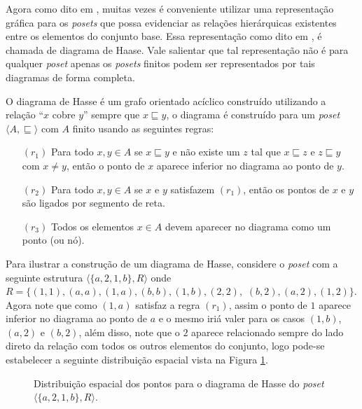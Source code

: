 Agora como dito em \cite{morgado1962poset}, muitas vezes é conveniente utilizar uma representação gráfica para os \textit{posets} que possa evidenciar as relações hierárquicas existentes entre os elementos do conjunto base. Essa representação como dito em \cite{abe1991-TC}, é chamada de diagrama de Haase. Vale salientar que tal representação não é para qualquer \textit{poset} apenas os \textit{posets} finitos podem ser representados por tais diagramas de forma completa.

O diagrama de Hasse é um grafo orientado acíclico construído utilizando a relação ``$x$ cobre $y$'' sempre que $x \sqsubseteq y$, o diagrama é construído para um \textit{poset} $\langle A, \sqsubseteq \rangle$ com $A$ finito usando as seguintes regras:

\begin{itemize}
	\item[$(r_1)$] Para todo $x, y \in A$ se $x \sqsubseteq  y$ e não existe um $z$ tal que $x \sqsubseteq  z$ e $z \sqsubseteq  y$ com $x \neq y$, então o ponto de $x$ aparece inferior no diagrama ao ponto de $y$.
	\item[$(r_2)$] Para todo $x, y \in A$ se $x$ e $y$ satisfazem $(r_1)$, então os pontos de $x$ e $y$ são ligados por segmento de reta.
	\item[$(r_3)$] Todos os elementos $x \in A$ devem aparecer no diagrama como um ponto (ou nó).
\end{itemize}

Para ilustrar a construção de um diagrama de Hasse, considere o \textit{poset} com a seguinte estrutura $\langle \{a, 2, 1, b\}, R \rangle$ onde $R = \{(1, 1), (a, a), (1, a), (b, b), (1, b), (2, 2),$ $(b, 2), (a, 2), (1, 2)\}$. Agora note que como $(1, a)$ satisfaz a regra $(r_1)$, assim o ponto de $1$ aparece inferior no diagrama ao ponto de $a$ e o mesmo iriá valer para os casos $(1, b)$, $(a, 2)$ e $(b, 2)$, além disso, note que o $2$ aparece relacionado sempre do lado direto da relação com todos os outros elementos do conjunto, logo pode-se estabelecer a seguinte distribuição espacial vista na Figura \ref{fig:PreDiagramaHasse}.

\begin{figure}[h]
  \centering
  \caption{Distribuição espacial dos pontos para o diagrama de Hasse do \textit{poset} $\langle \{a, 2, 1, b\}, R \rangle$.}
  \label{fig:PreDiagramaHasse}
\end{figure}

